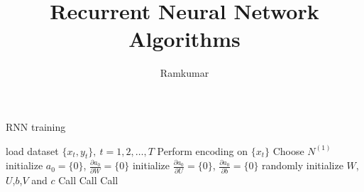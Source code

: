 \documentclass{article}
\title{Recurrent Neural Network Algorithms}
\author{Ramkumar}
\newcommand{\diag}[1]{diag({#1})}
\newcommand{\reshape}[2]{reshape \left({#1},\ {#2}\right)}
\newcommand{\bm}[1]{\textbf{#1}}
\newcommand{\der}[2]{\frac{\partial #1}{\partial #2}}
\begin{document}
\maketitle

\begin{algorithm}
    \renewcommand{\thealgorithm}{}
    \caption{RNN training}\label{alg:cap}
    \begin{algorithmic}
        \State load dataset $\{x_t,y_t\}, \ t=1,2,\dots,T$
        \State Perform encoding on $\{x_t\}$ 
        \State Choose $N^{(1)}$ 
        \State initialize $a_0=\{0\}$, $\frac{\partial a_0}{\partial W} = \{0\}$
        \State initialize $\frac{\partial a_0}{\partial U}=\{0\}$, $\frac{\partial a_0}{\partial b} = \{0\}$
        \State randomly initialize $W$,$U$,$b$,$V$ and $c$ 
        \Repeat
        \State Call 
        \State Call 
        \State Call 

\end{algorithmic}
\end{algorithm}
\end{document}
